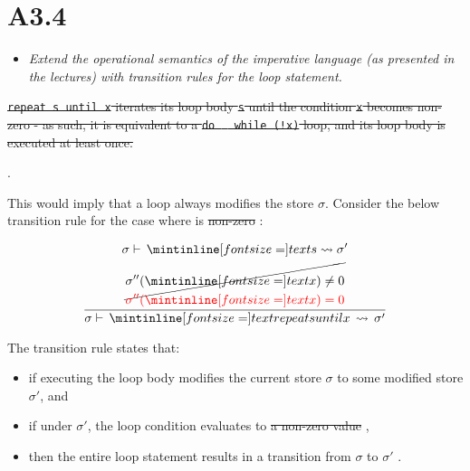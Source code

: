 \newpage
\section{A3.4 }

\begin{itemize}
  \item \emph{Extend the operational semantics of the imperative language (as
    presented in the lectures) with transition rules for the \emph{}
    loop statement.}
\end{itemize}

\st{\texttt{repeat s until x} iterates its loop body \texttt{s} until the condition \texttt{x}
becomes non-zero - as such, it is equivalent to a \texttt{do { } while (!x)}
loop, and its loop body is executed at least once.}

\medskip

.


\medskip

This would imply that a  loop always modifies the store $\sigma$.
Consider the below transition rule for the case where  is \st{non-zero}
:


\begin{gather*}
  \frac{
    \begin{gathered}
      \sigma          \vdash \, \ms{s} \leadsto \sigma'\\
      \cancel{\sigma''(\ms{x}) \neq 0}\\
      \resub{\sigma''(\ms{x}) = 0}\\
    \end{gathered}
  }{\sigma \vdash \, \ms{repeat s until x} \, \leadsto \, \sigma'}
\end{gather*}

The transition rule states that:

\begin{itemize}
  \item if executing the loop body  modifies the current store $\sigma$ to
    some modified store $\sigma'$, and 

  \item if under $\sigma'$, the loop condition  evaluates to \st{a
    non-zero value} ,

  \item then the entire loop statement results in a transition from $\sigma$ to
    $\sigma'$ .
\end{itemize}


